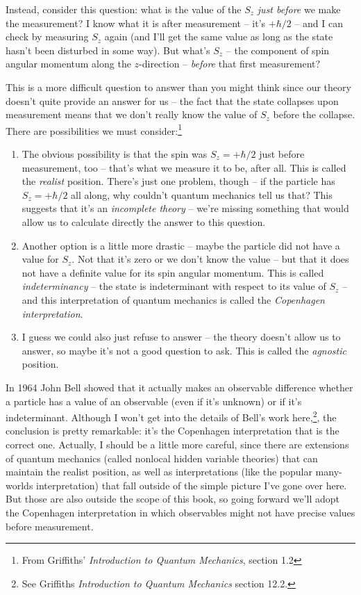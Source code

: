 Instead, consider this question:  what is the value of the $S_z$ \emph{just before} we make the measurement?  I know what it is after measurement -- it's $+\hbar/2$ -- and I can check by measuring $S_z$ again (and I'll get the same value as long as the state hasn't been disturbed in some way).  But what's $S_z$ -- the component of spin angular momentum along the $z$-direction -- \emph{before} that first measurement?

This is a more difficult question to answer than you might think since our theory doesn't quite provide an answer for us -- the fact that the state collapses upon measurement means that we don't really know the value of $S_z$ before the collapse.  There are possibilities we must consider:\footnote{From Griffiths' \emph{Introduction to Quantum Mechanics}, section 1.2}
\begin{enumerate}
\item The obvious possibility is that the spin was $S_z  = +\hbar/2$ just before measurement, too -- that's what we measure it to be, after all. This is called the \emph{realist} position.  There's just one problem, though -- if the particle has $S_z = +\hbar/2$ all along, why couldn't quantum mechanics tell us that?  This suggests that it's an \emph{incomplete theory} -- we're missing something that would allow us to calculate directly the answer to this question.
\item Another option is a little more drastic -- maybe the particle did not have a value for $S_z$.  Not that it's zero or we don't know the value -- but that it does not have a definite value for its spin angular momentum.  This is called \emph{indeterminancy} -- the state is indeterminant with respect to its value of $S_z$ -- and this interpretation of quantum mechanics is called the \emph{Copenhagen interpretation}.  
\item I guess we could also just refuse to answer -- the theory doesn't allow us to answer, so maybe it's not a good question to ask.  This is called the \emph{agnostic} position.
\end{enumerate}

In 1964 John Bell showed that it actually makes an observable difference whether a particle has a value of an observable (even if it's unknown) or if it's indeterminant.  Although I won't get into the details of Bell's work here,\footnote{See Griffiths \emph{Introduction to Quantum Mechanics} section 12.2.}, the conclusion is pretty remarkable: it's the Copenhagen interpretation that is the correct one.  Actually, I should be a little more careful, since there are extensions of quantum mechanics (called nonlocal hidden variable theories) that can maintain the realist position, as well as interpretations (like the popular many-worlds interpretation) that fall outside of the simple picture I've gone over here.  But those are also outside the scope of this book, so going forward we'll adopt the Copenhagen interpretation in which observables might not have precise values before measurement.



